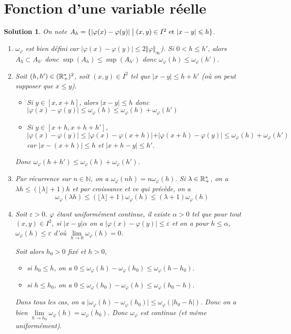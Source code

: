 \documentclass[12pt]{article}
\newtheorem{solution}{Solution}[section]
\theoremstyle{remark}
\newcommand{\N}{\mathbb{N}} \newcommand{\Z}{\mathbb{Z}}
\begin{document}
\cleardoublepage
\section{Fonction d'une variable réelle}

\begin{solution}
	On note $A_{h}=\{\vert\varphi(x)-\varphi(y)\vert\bigm|(x,y)\in I^{2}\text{ et }\vert x-y\vert\leqslant h\}$.
	\begin{enumerate}
		\item $\omega_{\varphi}$ est bien défini car $\vert\varphi(x)-\varphi(y)\vert\leqslant 2\Vert\varphi\Vert_{\infty}$). Si $0<h\leqslant h'$, alors $A_{h}\subset A_{h'}$ donc $\sup(A_{h})\leqslant\sup(A_{h'})$ donc $\omega_{\varphi}(h)\leqslant\omega_{\varphi}(h')$.
		\item Soit $(h,h')\in(\mathbb{R}_{+}^{*})^{2}$, soit $(x,y)\in I^{2}$ tel que $\vert x-y\vert\leqslant h+h'$ (où on peut supposer que $x\leqslant y$).
		\begin{itemize}
			\item Si $y\in[x,x+h]$, alors $\vert x-y\vert\leqslant h$ donc $\vert\varphi(x)-\varphi(y)\vert\leqslant\omega_{\varphi}(h)\leqslant\omega_\varphi(h)+\omega_{\varphi}(h')$
			\item Si $y\in[x+h,x+h+h']$, $\vert\varphi(x)-\varphi(y)\vert\leqslant\vert\varphi(x)-\varphi(x+h)\vert+\vert\varphi(x+h)-\varphi(y)\vert\leqslant\omega_\varphi(h)+\omega_{\varphi}(h')$ car $\vert x-(x+h)\vert\leqslant h$ et $\vert x+h-y\vert\leqslant h'$.
		\end{itemize}
		Donc $\omega_{\varphi}(h+h')\leqslant\omega_\varphi(h)+\omega_\varphi(h')$.
		\item Par récurrence sur $n\in\N$, on a $\omega_\varphi(nh)=n\omega_\varphi(h)$. Si $\lambda\in\mathbb{R}_{+}^{*}$, on a $\lambda h\leqslant(\lfloor \lambda\rfloor+1)h$ et par croissance et ce qui précède, on a 
		$$\omega_\varphi(\lambda h)\leqslant(\lfloor\lambda\rfloor+1)\omega_\varphi(h)\leqslant(\lambda+1)\omega_\varphi(h)$$
		\item Soit $\varepsilon>0$. $\varphi$ étant uniformément continue, il existe $\alpha>0$ tel que pour tout $(x,y)\in I^{2}$, si $\vert x-y\vert\alpha$ on a $\vert\varphi(x)-\varphi(y)\vert\leqslant\varepsilon$ et on a pour $h\leqslant\alpha$, $\omega_\varphi(h)\leqslant\varepsilon$ d'où $\lim\limits_{h\to0}\omega_\varphi(h)=0$.
		
		Soit alors $h_{0}>0$ fixé et $h>0$,
		\begin{itemize}
			\item si $h_{0}\leqslant h$, on a $0\leqslant\omega_\varphi(h)-\omega_\varphi(h_0)\leqslant\omega_\varphi(h-h_0)$.
			\item si $h\leqslant h_{0}$, on a $0\leqslant\omega_\varphi(h_0)-\omega_\varphi(h)\leqslant\omega_\varphi(h_0-h)$.
		\end{itemize}
		Dans tous les cas, on a $\vert\omega_\varphi(h)-\omega_\varphi(h_{0})\vert\leqslant\omega_\varphi(\vert h_{0}-h\vert)$. Donc on a bien $\lim\limits_{h\to h_{0}}\omega_\varphi(h)=\omega_\varphi(h_{0})$. Donc $\omega_{\varphi}$ est continue (et même uniformément).
	\end{enumerate}
\end{solution}
\end{document}
